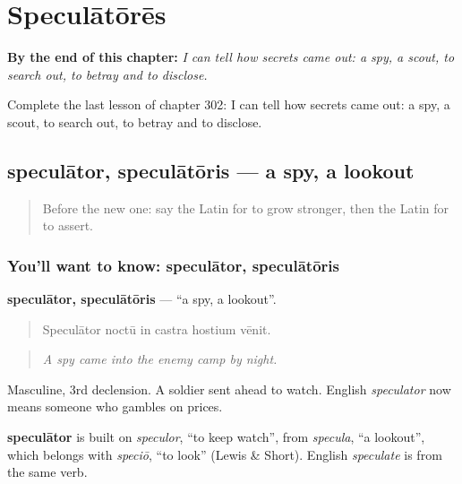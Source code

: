 
\chapter{Speculātōrēs}
\label{ch:la-speculatores}

\begin{chapteropening}
\textbf{By the end of this chapter:} \emph{I can tell how secrets came out: a spy, a scout, to search out, to betray and to disclose.}

Complete the last lesson of chapter 302: I can tell how secrets came out: a spy, a scout, to search out, to betray and to disclose.
\end{chapteropening}

\section[speculātor, speculātōris]{speculātor, speculātōris — a spy, a lookout}

\label{lesson:LA-C302-speculator}



\begin{quote}
Before the new one: say the Latin for to grow stronger, then the Latin for to assert.
\end{quote}

\subsection*{You'll want to know: speculātor, speculātōris}
\textbf{speculātor, speculātōris} — \textquotedblleft{}a spy, a lookout\textquotedblright{}.

\begin{quote}
Speculātor noctū in castra hostium vēnit.
\end{quote}

\begin{quote}
\emph{A spy came into the enemy camp by night.}
\end{quote}

Masculine, 3rd declension. A soldier sent ahead to watch. English \emph{speculator} now means someone who gambles on prices.

\begin{cousinweb}
\textbf{speculātor} is built on \emph{speculor}, \textquotedblleft{}to keep watch\textquotedblright{}, from \emph{specula}, \textquotedblleft{}a lookout\textquotedblright{}, which belongs with \emph{speciō}, \textquotedblleft{}to look\textquotedblright{} (Lewis \& Short). English \emph{speculate} is from the same verb.
\end{cousinweb}


